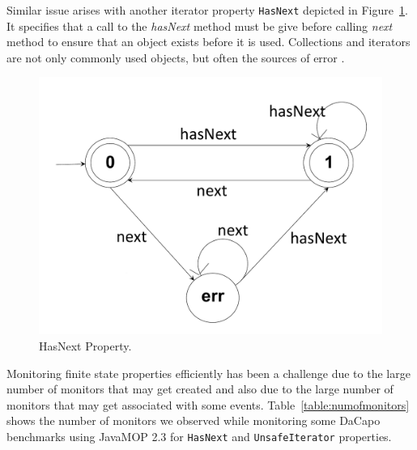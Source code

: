 Similar issue arises with another iterator property \texttt{HasNext} depicted in Figure~\ref{fig:hasnextfsa}. It specifies that a call to the \textit{hasNext} method must be give before calling \textit{next} method to ensure that an object exists before it is used. Collections and iterators are not only commonly used objects, but often the sources of error \cite{}. 

\begin{figure}[t]
\centering
  \includegraphics[trim=20cm 0cm 15cm 1cm, scale=0.2]{./images/HasNext.pdf}
  \caption[HasNext Property FSA]{HasNext Property.}
  \label{fig:hasnextfsa}
\end{figure}

Monitoring finite state properties efficiently has been a challenge due to the large number of monitors that may get created and also due to the large number of monitors that may get associated with some events. Table~\ref{table:numofmonitors} shows the number of monitors we observed while monitoring some DaCapo benchmarks using JavaMOP 2.3 for \texttt{HasNext} and \texttt{UnsafeIterator} properties.



